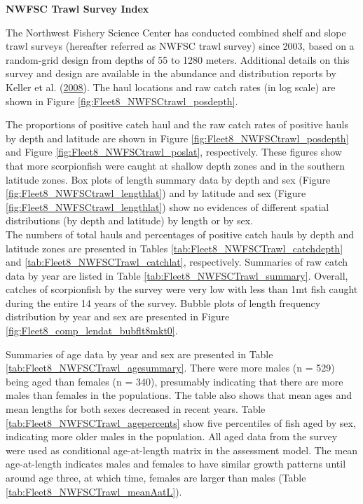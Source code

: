 \documentclass[12pt,]{article}
\begin{document}
\textbf{NWFSC Trawl Survey Index}

The Northwest Fishery Science Center has conducted combined shelf and
slope trawl surveys (hereafter referred as NWFSC trawl survey) since
2003, based on a random-grid design from depths of 55 to 1280 meters.
Additional details on this survey and design are available in the
abundance and distribution reports by Keller et al.
(\protect\hyperlink{ref-Keller2008}{2008}). The haul locations and raw
catch rates (in log scale) are shown in Figure
\ref{fig:Fleet8_NWFSCtrawl_posdepth}.

The proportions of positive catch haul and the raw catch rates of
positive hauls by depth and latitude are shown in Figure
\ref{fig:Fleet8_NWFSCtrawl_posdepth} and Figure
\ref{fig:Fleet8_NWFSCtrawl_poslat}, respectively. These figures show
that more scorpionfish were caught at shallow depth zones and in the
southern latitude zones. Box plots of length summary data by depth and
sex (Figure \ref{fig:Fleet8_NWFSCtrawl_lengthlat}) and by latitude and
sex (Figure \ref{fig:Fleet8_NWFSCtrawl_lengthlat}) show no evidences of
different spatial distributions (by depth and latitude) by length or by
sex.\\
The numbers of total hauls and percentages of positive catch hauls by
depth and latitude zones are presented in Tables
\ref{tab:Fleet8_NWFSCTrawl_catchdepth} and
\ref{tab:Fleet8_NWFSCTrawl_catchlat}, respectively. Summaries of raw
catch data by year are listed in Table
\ref{tab:Fleet8_NWFSCTrawl_summary}. Overall, catches of scorpionfish by
the survey were very low with less than 1mt fish caught during the
entire 14 years of the survey. Bubble plots of length frequency
distribution by year and sex are presented in Figure
\ref{fig:Fleet8_comp_lendat_bubflt8mkt0}.

Summaries of age data by year and sex are presented in Table
\ref{tab:Fleet8_NWFSCTrawl_agesummary}. There were more males (n = 529)
being aged than females (n = 340), presumably indicating that there are
more males than females in the populations. The table also shows that
mean ages and mean lengths for both sexes decreased in recent years.
Table \ref{tab:Fleet8_NWFSCTrawl_agepercents} show five percentiles of
fish aged by sex, indicating more older males in the population. All
aged data from the survey were used as conditional age-at-length matrix
in the assessment model. The mean age-at-length indicates males and
females to have similar growth patterns until around age three, at which
time, females are larger than males (Table
\ref{tab:Fleet8_NWFSCTrawl_meanAatL}).
\end{document}
